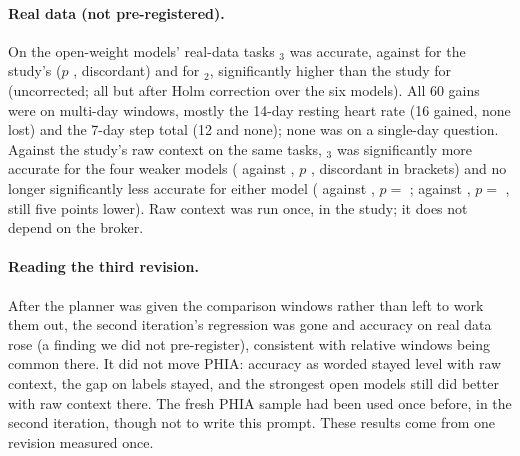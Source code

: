 \paragraph{Real data (not pre-registered).} On the open-weight models' real-data tasks \CC{}$_3$ was
\vthreeRealThree{} accurate, against \vthreeRealOne{} for the study's \CC{} ($p$ \vthreeRealP{},
\vthreeRealPairs{} discordant) and \vthreeRealTwo{} for \CC{}$_2$, significantly higher than the study for
\vthreeRealSig{} (uncorrected; all but  after Holm correction over the six models). All 60
gains were on multi-day windows, mostly the 14-day resting heart rate (16 gained, none lost) and the 7-day step
total (12 and none); none was on a single-day question. Against the study's raw context on the same tasks, \CC{}$_3$ was significantly more accurate for
the four weaker models ( \vthreeRealLlamaThree{} against \vthreeRealLlamaThreeA{}, $p$
\vthreeRealMcnALlamaThree{}, discordant in brackets) and no longer significantly less accurate for either
 model ( \vthreeRealOssLarge{} against \vthreeRealOssLargeA{}, $p=$
\vthreeRealMcnAOssLarge{};  \vthreeRealOssSmall{} against \vthreeRealOssSmallA{}, $p=$
\vthreeRealMcnAOssSmall{}, still five points lower). Raw context
was run once, in the study; it does not depend on the broker.

\paragraph{Reading the third revision.} After the planner was given the comparison windows rather than left to work
them out, the second iteration's regression was gone and accuracy on real data rose (a finding we did not
pre-register), consistent with relative windows being common there. It did not move PHIA: accuracy as worded stayed level with raw context, the gap on labels stayed, and the
strongest open models still did better with raw context there. The fresh PHIA sample had been used once before, in
the second iteration, though not to write this prompt. These results come from one revision measured once.
